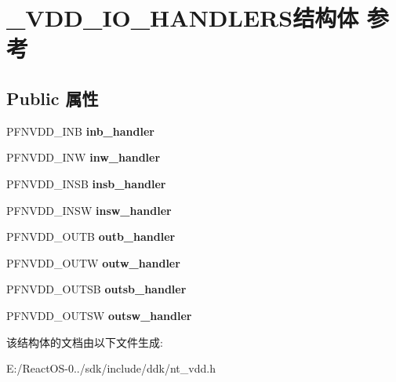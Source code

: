 \hypertarget{struct___v_d_d___i_o___h_a_n_d_l_e_r_s}{}\section{\+\_\+\+V\+D\+D\+\_\+\+I\+O\+\_\+\+H\+A\+N\+D\+L\+E\+R\+S结构体 参考}
\label{struct___v_d_d___i_o___h_a_n_d_l_e_r_s}
\subsection*{Public 属性}
\begin{DoxyCompactItemize}
\item 
\mbox{\label{struct___v_d_d___i_o___h_a_n_d_l_e_r_s_a9eec6d3655905ba8f10e0c7208c3a298}} 
P\+F\+N\+V\+D\+D\+\_\+\+I\+NB {\bfseries inb\+\_\+handler}
\item 
\mbox{\label{struct___v_d_d___i_o___h_a_n_d_l_e_r_s_a19c1d8963ccbdcdb3c8b303f0d0ffd1e}} 
P\+F\+N\+V\+D\+D\+\_\+\+I\+NW {\bfseries inw\+\_\+handler}
\item 
\mbox{\label{struct___v_d_d___i_o___h_a_n_d_l_e_r_s_ab72064185e85b9f95f43a2de265ff608}} 
P\+F\+N\+V\+D\+D\+\_\+\+I\+N\+SB {\bfseries insb\+\_\+handler}
\item 
\mbox{\label{struct___v_d_d___i_o___h_a_n_d_l_e_r_s_a7d78e9674736f67230930b2c0f6e6443}} 
P\+F\+N\+V\+D\+D\+\_\+\+I\+N\+SW {\bfseries insw\+\_\+handler}
\item 
\mbox{\label{struct___v_d_d___i_o___h_a_n_d_l_e_r_s_a70bfbda4e53561c6e4b81e7b672c6bdf}} 
P\+F\+N\+V\+D\+D\+\_\+\+O\+U\+TB {\bfseries outb\+\_\+handler}
\item 
\mbox{\label{struct___v_d_d___i_o___h_a_n_d_l_e_r_s_a6b24c25ed6b8e3e51e4e5648c02ca3fb}} 
P\+F\+N\+V\+D\+D\+\_\+\+O\+U\+TW {\bfseries outw\+\_\+handler}
\item 
\mbox{\label{struct___v_d_d___i_o___h_a_n_d_l_e_r_s_a1bcc0ba59b92d699cdad26c1aac34772}} 
P\+F\+N\+V\+D\+D\+\_\+\+O\+U\+T\+SB {\bfseries outsb\+\_\+handler}
\item 
\mbox{\label{struct___v_d_d___i_o___h_a_n_d_l_e_r_s_ad4f3d3a1e6cf8162934edfc1f791ec6d}} 
P\+F\+N\+V\+D\+D\+\_\+\+O\+U\+T\+SW {\bfseries outsw\+\_\+handler}
\end{DoxyCompactItemize}


该结构体的文档由以下文件生成\+:\begin{DoxyCompactItemize}
\item 
E\+:/\+React\+O\+S-\/0../sdk/include/ddk/nt\+\_\+vdd.\+h\end{DoxyCompactItemize}
